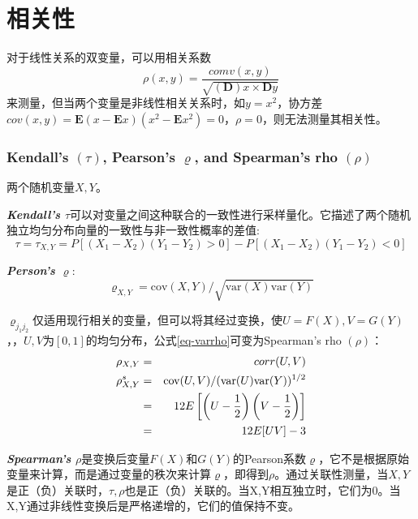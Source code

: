 \documentclass[UTF8]{ctexart}
\begin{document}
\section{相关性}
对于线性关系的双变量，可以用相关系数\[
    \rho(x,y) = \dfrac{comv(x,y)}{\sqrt{(\mathbf{D})x \times \mathbf{D}y}}
\]
来测量，但当两个变量是非线性相关关系时，如$y=x^2$，协方差$cov(x,y)=\mathbf{E}(x-\mathbf{E}x)(x^2-\mathbf{E}x^2) = 0$，$\rho=0$，则无法测量其相关性。




\subsubsection{Kendall's $(\tau)$, Pearson's $\varrho$, and Spearman's rho $(\rho)$}
两个随机变量$X,Y$。

\emph{\textbf{\textcolor[rgb]{1,0,0}{Kendall's $\tau$}}}可以对变量之间这种联合的一致性进行采样量化。它描述了两个随机独立均匀分布向量的一致性与非一致性概率的差值\cite{Montes2015}:
\begin{equation}
    \tau = \tau_{X,Y} = P[(X_1-X_2)(Y_1-Y_2) > 0] - P[(X_1-X_2)(Y_1-Y_2)<0]
    \label{eq-tau}
\end{equation}



\emph{\textbf{\textcolor[rgb]{1,0,0}{Person's $\varrho$}}}:
\begin{equation}   
    \label{eq-varrho}
    \varrho_{X,Y} = \text{cov}(X,Y)/\sqrt{\text{var}(X)\text{var}(Y)}
\end{equation}


$\varrho_{j_1 j_2}$仅适用现行相关的变量，但可以将其经过变换，使$U=F(X),V=G(Y)$，\cite{Smith2009}，$U,V$为$[0,1]$的均匀分布，公式\ref{eq-varrho}可变为\textcolor[rgb]{1,0,0}{Spearman's rho $(\rho)$}：
\begin{eqnarray}
    \rho_{X,Y} &=& corr(U,V) \notag \\
    \rho_{X,Y}^s &=& \text{cov}(U,V)/(\text{var}(U)\text{var}(Y))^{1/2} \notag \\
    &=& 12E \left[ \left(U - \dfrac{1}{2}\right)\left(V - \dfrac{1}{2}\right) \right] \notag \\
    &=& 12E [UV] -3
    \label{eq-rhoSimplified}
\end{eqnarray}

\emph{\textbf{\textcolor[rgb]{1,0,0}{Spearman's $\rho$}}}是变换后变量$F(X)$和$G(Y)$的Pearson系数$\varrho$\cite{Montes2015}，它不是根据原始变量来计算，而是通过变量的秩次来计算$\varrho$，即得到$\rho$。通过关联性测量，当$X,Y$是正（负）关联时，$\tau,\rho$也是正（负）关联的。当X,Y相互独立时，它们为0。当X,Y通过非线性变换后是严格递增的，它们的值保持不变。
\end{document}
